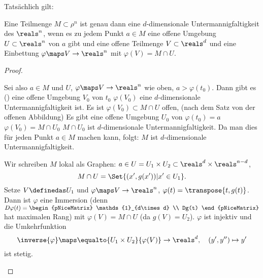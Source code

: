 Tatsächlich gilt:
\begin{satz}\label{mannigfaltigkeiten_sind_parametisierbar}
  Eine Teilmenge \( M\subset \rho^n \) ist genau dann eine \( d \)-dimensionale Untermannigfaltigkeit des \( \reals^n \), wenn es zu jedem Punkt \( a\in M \) eine offene Umgebung \( U\subset \reals^n \) von \( a \) gibt und eine offene Teilmenge \( V\subset \reals^d \) und eine Einbettung \( \varphi\maps V\to \reals^n \) mit \( \varphi(V)=M\cap U \).
\end{satz}
\begin{proof}
  \begin{proofdescription}
    \item[\rueck] Sei also \( a\in M \) und \( U \), \( \varphi\maps V\to \reals^n \) wie oben, \( a>\varphi(t_0) \). Dann gibt es () eine offene Umgebung \( V_0 \) von \( t_0 \) \sd \( \varphi(V_0) \) eine \( d \)-dimensionale Untermannigfaltigkeit ist. Es ist \( \varphi(V_0)\subset M\cap U \) offen, (nach dem Satz von der offenen Abbildung) \timplies Es gibt eine offene Umgebung \( U_0 \) von \( \varphi(t_0)=a \) \sd \( \varphi(V_0)=M\cap U_0 \) \timplies \( M\cap U_0 \) ist \( d \)-dimensionale Untermannigfaltigkeit. Da man dies für jeden Punkt \( a\in M \) machen kann, folgt: \( M \) ist \( d \)-dimensionale Untermannigfaltigkeit.
    \item[\hin] Wir schreiben \( M \) lokal als Graphen: \( a\in U=U_1\times U_2\subset \reals^d\times\reals^{n-d} \),   
    \begin{equation*}
      M\cap U=\Set{(x',g(x'))|x'\in U_1}.
    \end{equation*}
    Setze \( V\definedas U_1 \) und \( \varphi\maps V\to \reals^n \), \( \varphi(t)=\transpose{t,g(t)} \). Dann ist \( \varphi \) eine Immersion (denn \( D\varphi(t)=\begin{pNiceMatrix} \mathds{1}_{d\times d} \\ Dg(t) \end{pNiceMatrix} \) hat maximalen Rang) mit \( \varphi(V)=M\cap U \) (da \( g(V)=U_2 \)). \( \varphi \) ist injektiv und die Umkehrfunktion
      \begin{equation*}
        \inverse{\varphi}\maps \equalto{U_1\times U_2}{\varphi(V)}\to \reals^d,\quad (y',y'')\mapsto y'
      \end{equation*}
      ist stetig.
  \end{proofdescription}
  
\end{proof}
